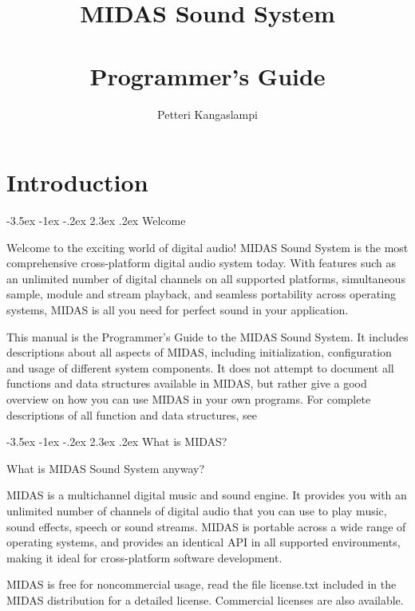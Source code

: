 \documentclass[a4paper,12pt,oneside]{book}
\author{Petteri Kangaslampi}
\title{MIDAS Sound System\\ \ \\ Programmer's Guide}
\makeatletter
\renewcommand\section{\@startsection {section}{1}{-20pt}%
                                   {-3.5ex \@plus -1ex \@minus -.2ex}%
                                   {2.3ex \@plus.2ex}%
                                   {\normalfont\Large\bfseries}}
\newcommand{\mFileName}[1]{{\ttfamily #1}}
\makeatother
\begin{document}
\maketitle
{}
\tableofcontents

\newpage
{}
\chapter{Introduction}

\section{Welcome}

Welcome to the exciting world of digital audio! MIDAS Sound System is the
most comprehensive cross-platform digital audio system today. With features
such as an unlimited number of digital channels on all supported platforms,
simultaneous sample, module and stream playback, and seamless portability
across operating systems, MIDAS is all you need for perfect sound in your
application.

This manual is the Programmer's Guide to the MIDAS Sound System. It includes
descriptions about all aspects of MIDAS, including initialization,
configuration and usage of different system components. It does not attempt
to document all functions and data structures available in MIDAS, but
rather give a good overview on how you can use MIDAS in your own
programs. For complete descriptions of all function and data structures, see


\section{What is MIDAS?}

What is MIDAS Sound System anyway?

MIDAS is a multichannel digital music and sound engine. It provides you with
an unlimited number of channels of digital audio that you can use to play
music, sound effects, speech or sound streams. MIDAS is portable across a
wide range of operating systems, and provides an identical API in all
supported environments, making it ideal for cross-platform software
development.

MIDAS is free for noncommercial usage, read the file
\mFileName{license.txt} included in the MIDAS distribution for a detailed
license. Commercial licenses are also available.
\end{document}
